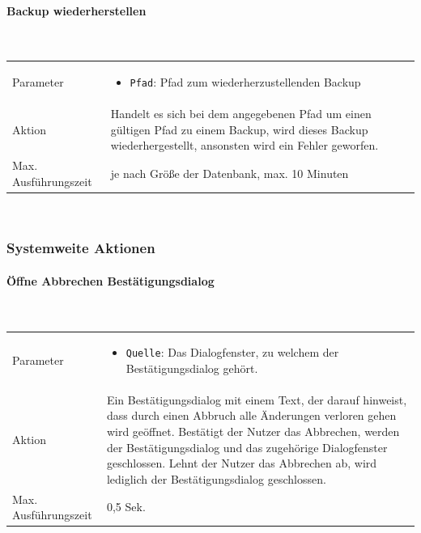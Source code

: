 \documentclass[fontsize=12pt,paper=a4,twoside]{scrartcl}
\begin{document}
\paragraph{Backup wiederherstellen}\mbox{}\\

\begin{tabularx}{\textwidth}{p{4cm}X}
Parameter & \begin{itemize}
			\item \texttt{Pfad}: Pfad zum wiederherzustellenden Backup
			\end{itemize}\\
Aktion & Handelt es sich bei dem angegebenen Pfad um einen gültigen Pfad zu einem Backup, wird dieses Backup wiederhergestellt, ansonsten wird ein Fehler geworfen.\\
Max. Ausführungszeit & je nach Größe der Datenbank, max. 10 Minuten 
\end{tabularx}\\


\subsubsection{Systemweite Aktionen}

\paragraph{Öffne Abbrechen Bestätigungsdialog}\mbox{}\\

\begin{tabularx}{\textwidth}{p{4cm}X}
Parameter & \begin{itemize}[itemsep=0pt, leftmargin = 0.5cm]
			\item \texttt{Quelle}: Das Dialogfenster, zu welchem der Bestätigungsdialog gehört.
			\end{itemize}\\
Aktion & Ein Bestätigungsdialog mit einem Text, der darauf hinweist, dass durch einen Abbruch alle Änderungen verloren gehen wird geöffnet. Bestätigt der Nutzer das Abbrechen, werden der Bestätigungsdialog und das zugehörige Dialogfenster geschlossen. Lehnt der Nutzer das Abbrechen ab, wird lediglich der Bestätigungsdialog geschlossen.\\
Max. Ausführungszeit & 0,5 Sek. 
\end{tabularx}\\
  
\end{document}
